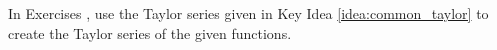 {\noindent In Exercises}
{, use the Taylor series  given in Key Idea \ref{idea:common_taylor} to create the Taylor series of the given functions.
}
